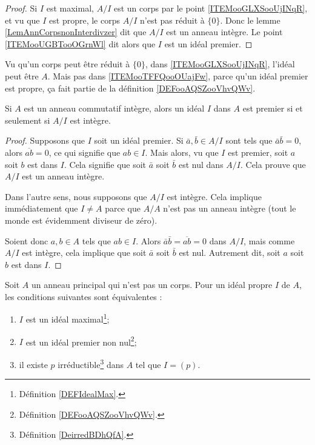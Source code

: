 \begin{proof}
    Si \( I\) est maximal, \( A/I\) est un corps par le point \ref{ITEMooGLXSooUjINqR}, et vu que \( I\) est propre, le corps \( A/I\) n'est pas réduit à \( \{ 0 \}\). Donc le lemme \ref{LemAnnCorpsnonInterdivzer} dit que \( A/I\) est un anneau intègre. Le point \ref{ITEMooUGBTooOGrnWl} dit alors que \( I\) est un idéal premier.
\end{proof}

\begin{remark}
    Vu qu'un corps peut être réduit à \( \{0\}\), dans \ref{ITEMooGLXSooUjINqR}, l'idéal peut être \( A\). Mais pas dans \ref{ITEMooTFFQooOUajFw}, parce qu'un idéal premier est propre, ça fait partie de la définition \ref{DEFooAQSZooVhvQWv}.
\end{remark}

\begin{proposition}     \label{PROPooHABIooBZZQMj}
    Si \( A\) est un anneau commutatif intègre, alors un idéal \( I\) dans \( A\) est premier si et seulement si \( A/I\) est intègre.
\end{proposition}

\begin{proof}
    Supposons que \( I\) soit un idéal premier. Si \( \bar a,\bar b\in A/I\)  sont tels que \( \bar a\bar b=0\), alors \( \overline{ ab }=0\), ce qui signifie que \( ab\in I\). Mais alors, vu que \( I\) est premier, soit \( a\) soit \( b\) est dans \( I\). Cela signifie que soit \( \bar a\) soit \( \bar b\) est nul dans \( A/I\). Cela prouve que \( A/I\) est un anneau intègre.

    Dans l'autre sens, nous supposons que \( A/I\) est intègre. Cela implique immédiatement que \( I\neq A\) parce que \( A/A\) n'est pas un anneau intègre (tout le monde est évidemment diviseur de zéro).

    Soient donc \( a,b\in A\) tels que \( ab\in I\). Alors \( \bar a\bar b= \overline{ ab }=0\) dans \( A/I\), mais comme \( A/I\) est intègre, cela implique que soit \( \bar a\) soit \( \bar b\) est nul. Autrement dit, soit \( a\) soit \( b\) est dans \( I\).
\end{proof}

\begin{proposition} \label{PropomqcGe}
    Soit \( A\) un anneau principal qui n'est pas un corps. Pour un idéal propre \( I\) de \( A\), les conditions suivantes sont équivalentes :
    \begin{enumerate}
        \item       \label{ITEMooNOVFooEHtcwE}
            \( I\) est un idéal maximal\footnote{Définition \ref{DEFIdealMax}.};
        \item       \label{ITEMooMQWVooNocVEU}
            \( I\) est un idéal premier non nul\footnote{Définition \ref{DEFooAQSZooVhvQWv}.};
        \item       \label{ITEMooJBXGooEISNuW}
            il existe \( p\) irréductible\footnote{Définition \ref{DeirredBDhQfA}.} dans \( A\) tel que \( I=(p)\).
    \end{enumerate}
\end{proposition}

